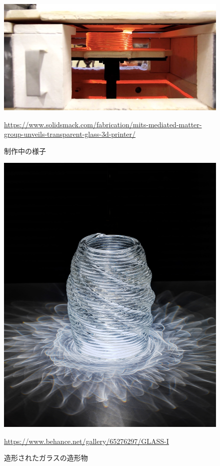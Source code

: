 \begin{figure}[H]
  \centering
  \includegraphics[width=13truecm]{./fig/Additive3.jpg}
  \caption{制作中の様子}
  \url{https://www.solidsmack.com/fabrication/mits-mediated-matter-group-unveils-transparent-glass-3d-printer/} %
  \label{fig:ferret}
\end{figure}

\begin{figure}[H]
  \centering
  \includegraphics[width=8truecm]{./fig/Additive1.jpg}
  \caption{造形されたガラスの造形物}
  \url{https://www.behance.net/gallery/65276297/GLASS-I} %
  \label{fig:ferret}
\end{figure}

